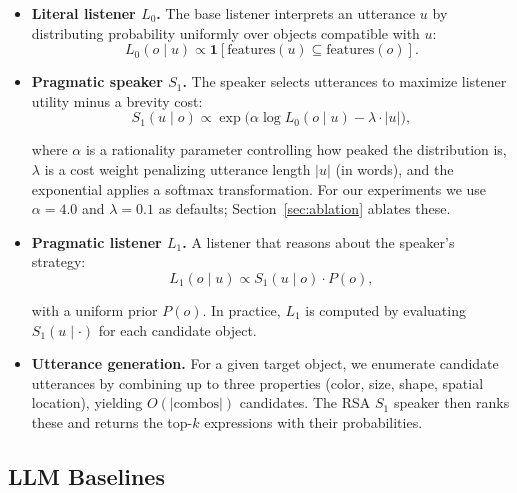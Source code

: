 \documentclass[10pt]{article}
\begin{document}
\begin{itemize}[noitemsep, topsep=0pt]
    \item  \textbf{Literal listener $L_0$.} The base listener interprets an utterance $u$ by distributing probability uniformly over objects compatible with $u$:
    \vspace{-3mm}
    \[
    L_0(o \mid u) \propto \mathbf{1}[\text{features}(u) \subseteq \text{features}(o)].
    \]
    \vspace{-7mm}

    \item  \textbf{Pragmatic speaker $S_1$.} The speaker selects utterances to maximize listener utility minus a brevity cost:
    \vspace{-3mm}
    \[
    S_1(u \mid o) \propto \exp\!\Big(\alpha \log L_0(o \mid u) - \lambda \cdot |u|\Big),
    \]
    \vspace{-7mm}
    
    where $\alpha$ is a rationality parameter controlling how peaked the distribution is, $\lambda$ is a cost weight penalizing utterance length $|u|$ (in words), and the exponential applies a softmax transformation. For our experiments we use $\alpha = 4.0$ and $\lambda = 0.1$ as defaults; Section~\ref{sec:ablation} ablates these.

    \item \textbf{Pragmatic listener $L_1$.} A listener that reasons about the speaker's strategy:
    \vspace{-3mm}
    \[
    L_1(o \mid u) \propto S_1(u \mid o) \cdot P(o),
    \]
    \vspace{-7mm}
    
    with a uniform prior $P(o)$. In practice, $L_1$ is computed by evaluating $S_1(u \mid \cdot)$ for each candidate object.
    
    \item \textbf{Utterance generation.} For a given target object, we enumerate candidate utterances by combining up to three properties (color, size, shape, spatial location), yielding $O(|\text{combos}|)$ candidates. The RSA $S_1$ speaker then ranks these and returns the top-$k$ expressions with their probabilities.
\end{itemize}




\subsection{LLM Baselines}
\end{document}
